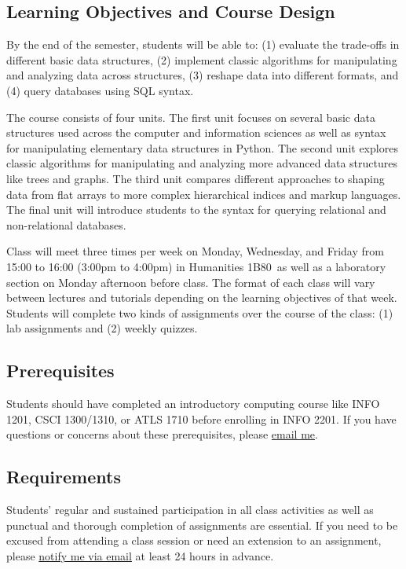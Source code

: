 \documentclass[10pt]{memoir}
\def\myclassroom{Humanities 1B80}
\begin{document}
\subsection{Learning Objectives and Course Design}
By the end of the semester, students will be able to: (1) evaluate the trade-offs in different basic data structures, (2) implement classic algorithms for manipulating and analyzing data across structures, (3) reshape data into different formats, and (4) query databases using SQL syntax.


The course consists of four units. The first unit focuses on several basic data structures used across the computer and information sciences as well as syntax for manipulating elementary data structures in Python. The second unit explores classic algorithms for manipulating and analyzing more advanced data structures like trees and graphs. The third unit compares different approaches to shaping data from flat arrays to more complex hierarchical indices and markup languages. The final unit will introduce students to the syntax for querying relational and non-relational databases.

Class will meet three times per week on Monday, Wednesday, and Friday from 15:00 to 16:00 (3:00pm to 4:00pm) in \myclassroom~as well as a laboratory section on Monday afternoon before class. The format of each class will vary between lectures and tutorials depending on the learning objectives of that week. Students will complete two kinds of assignments over the course of the class: (1) lab assignments and (2) weekly quizzes.

\subsection{Prerequisites}
Students should have completed an introductory computing course like INFO 1201, CSCI 1300/1310, or ATLS 1710 before enrolling in INFO 2201. If you have questions or concerns about these prerequisites, please \href{mailto:brian.keegan@colorado.edu}{email me}.

\subsection{Requirements}
Students' regular and sustained participation in all class activities as well as punctual and thorough completion of assignments are essential. If you need to be excused from attending a class session or need an extension to an assignment, please \href{mailto:brian.keegan@colorado.edu}{notify me via email} at least 24 hours in advance.
\end{document}
